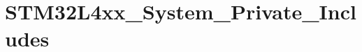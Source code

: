 \hypertarget{group___s_t_m32_l4xx___system___private___includes}{}\section{S\+T\+M32\+L4xx\+\_\+\+System\+\_\+\+Private\+\_\+\+Includes}
\label{group___s_t_m32_l4xx___system___private___includes}
